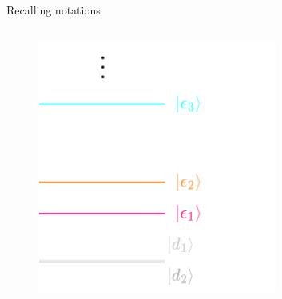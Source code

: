 \documentclass[10pt,xcolor={table,dvipsnames},t]{beamer}
\begin{document}
\begin{frame}{Recalling notations}
\begin{columns}
\begin{column}{0.5\textwidth}
\begin{center}
\begin{figure}
      \includegraphics[width=0.7\textwidth]{./energy_levels_deg1.png}
    \end{figure}
  \end{center}
    \end{column}
  \end{columns}
\end{frame}
\end{document}
